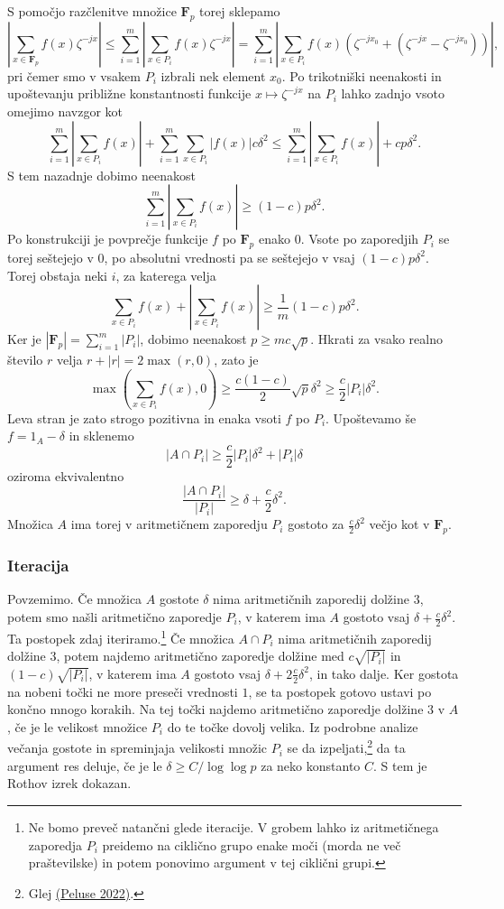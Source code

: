 \documentclass[11pt]{book}
\def\FF{\mathbf{F}}
\theoremstyle{definition}
\theoremstyle{zgled}
\theoremstyle{zgledbrezstevilke}
\theoremstyle{odprtproblem}
\theoremstyle{domacanaloga}
\theoremstyle{izrek}
\begin{document}
S pomočjo razčlenitve množice $\FF_p$ torej sklepamo
\[
   \left|\sum_{x \in \FF_p} f(x) \zeta^{-jx}\right| \leq
   \sum_{i = 1}^m \left| \sum_{x \in P_i} f(x) \zeta^{-jx} \right|
   = \sum_{i = 1}^m \left| \sum_{x \in P_i} f(x) \left( \zeta^{-jx_0} + (\zeta^{-jx} - \zeta^{-jx_0}) \right) \right|,
\]
pri čemer smo v vsakem $P_i$ izbrali nek element $x_0$. Po trikotniški neenakosti in upoštevanju približne konstantnosti funkcije $x \mapsto \zeta^{-jx}$ na $P_i$ lahko zadnjo vsoto omejimo navzgor kot
\[
    \sum_{i = 1}^m \left| \sum_{x \in P_i} f(x) \right| + 
    \sum_{i = 1}^m \sum_{x \in P_i} | f(x) | c \delta^2
    \leq \sum_{i = 1}^m \left| \sum_{x \in P_i} f(x) \right| + c p \delta^2.
\]
S tem nazadnje dobimo neenakost
\[
\sum_{i = 1}^m \left| \sum_{x \in P_i} f(x) \right| \geq (1-c) p \delta^2.
\]
Po konstrukciji je povprečje funkcije $f$ po $\FF_p$ enako $0$. Vsote po zaporedjih $P_i$ se torej seštejejo v $0$, po absolutni vrednosti pa se seštejejo v vsaj $(1-c) p \delta^2$. Torej obstaja neki $i$, za katerega velja
\[
    \sum_{x \in P_i} f(x)
    +
    \left| \sum_{x \in P_i} f(x) \right|
     \geq \frac{1}{m} (1-c) p \delta^2.  
\]
Ker je $|\FF_p| = \sum_{i = 1}^m |P_i|$, dobimo neenakost $p \geq m c \sqrt{p}$. Hkrati za vsako realno število $r$ velja $r + |r| = 2 \max(r, 0)$, zato je
\[
    \max \left( \sum_{x \in P_i} f(x), 0 \right) \geq
    \frac{c (1-c)}{2}  \sqrt{p} \delta^2
    \geq \frac{c}{2} |P_i| \delta^2.  
\]
Leva stran je zato strogo pozitivna in enaka vsoti $f$ po $P_i$. Upoštevamo še $f = 1_A - \delta$ in sklenemo
\[
    |A \cap P_i| \geq \frac{c}{2} |P_i| \delta^2 + |P_i| \delta
\]
oziroma ekvivalentno
\[
    \frac{|A \cap P_i|}{|P_i|} \geq \delta + \frac{c}{2} \delta^2.
\]
Množica $A$ ima torej v aritmetičnem zaporedju $P_i$ gostoto za $\frac{c}{2} \delta^2$ večjo kot v $\FF_p$.

\subsubsection{Iteracija}

Povzemimo. Če množica $A$ gostote $\delta$ nima aritmetičnih zaporedij dolžine $3$, potem smo našli aritmetično zaporedje $P_i$, v katerem ima $A$ gostoto vsaj $\delta + \frac{c}{2} \delta^2$. Ta postopek zdaj iteriramo.\footnote{Ne bomo preveč natančni glede iteracije. V grobem lahko iz aritmetičnega zaporedja $P_i$ preidemo na ciklično grupo enake moči (morda ne več praštevilske) in potem ponovimo argument v tej ciklični grupi.} Če množica $A \cap P_i$ nima aritmetičnih zaporedij dolžine $3$, potem najdemo aritmetično zaporedje dolžine med $c\sqrt{|P_i|}$ in $(1-c)\sqrt{|P_i|}$, v katerem ima $A$ gostoto vsaj $\delta + 2 \frac{c}{2} \delta^2$, in tako dalje. Ker gostota na nobeni točki ne more preseči vrednosti $1$, se ta postopek gotovo ustavi po končno mnogo korakih. Na tej točki najdemo aritmetično zaporedje dolžine $3$ v $A$, če je le velikost množice $P_i$ do te točke dovolj velika. Iz podrobne analize večanja gostote in spreminjaja velikosti množic $P_i$ se da izpeljati,\footnote{Glej \href{https://arxiv.org/pdf/2206.10037.pdf}{(Peluse 2022)}.} da ta argument res deluje, če je le $\delta \geq C/\log \log p$ za neko konstanto $C$. S tem je Rothov izrek dokazan.
\end{document}
